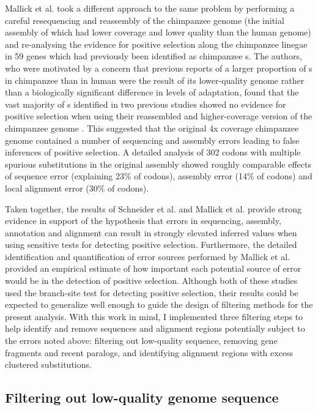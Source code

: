 Mallick et al. \citeyearpar{Mallick2009} took a different approach to
the same problem by performing a careful resequencing and reassembly
of the chimpanzee genome (the initial assembly of which had lower
coverage and lower quality than the human genome) and re-analysing the
evidence for positive selection along the chimpanzee linegae in 59
genes which had previously been identified as chimpanzee \psg{}s. The
authors, who were motivated by a concern that previous reports of a
larger proportion of \psg{}s in chimpanzee than in human
\citep{Bakewell2007} were the result of its lower-quality genome
rather than a biologically significant difference in levels of
adaptation, found that the vast majority of \psg{}s identified in two
previous studies showed no evidence for positive selection when using
their reassembled and higher-coverage version of the chimpanzee genome
\citep{Mallick2009}. This suggested that the original 4x coverage
chimpanzee genome contained a number of sequencing and assembly errors
leading to false inferences of positive selection. A detailed analysis
of 302 codons with multiple spurious \nsyn substitutions in the
original assembly showed roughly comparable effects of sequence error
(explaining 23\% of codons), assembly error (14\% of codons) and local
alignment error (30\% of codons).

Taken together, the results of Schneider et
al. \citeyearpar{Schneider2009} and Mallick et
al. \citeyearpar{Mallick2009} provide strong evidence in support of
the hypothesis that errors in sequencing, assembly, annotation and
alignment can result in strongly elevated inferred \omg values when
using sensitive tests for detecting positive selection. Furthermore,
the detailed identification and quantification of error sources
performed by Mallick et al. \citeyearpar{Mallick2009} provided an
empirical estimate of how important each potential source of error
would be in the detection of positive selection. Although both of
these studies used the branch-site test for detecting positive
selection, their results could be expected to generalize well enough
to guide the design of filtering methods for the present \sw
analysis. With this work in mind, I implemented three filtering steps
to help identify and remove sequences and alignment regions
potentially subject to the errors noted above: filtering out
low-quality sequence, removing gene fragments and recent paralogs, and
identifying alignment regions with excess clustered substitutions.

\subsection{Filtering out low-quality genome sequence}

